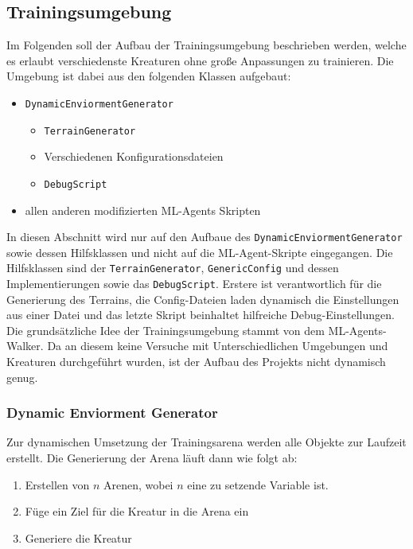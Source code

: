 
\subsection{Trainingsumgebung}
Im Folgenden soll der Aufbau der Trainingsumgebung beschrieben werden, welche es erlaubt verschiedenste Kreaturen ohne große Anpassungen zu trainieren. Die  Umgebung ist dabei aus den folgenden Klassen aufgebaut:

\begin{itemize}
	\item \texttt{DynamicEnviormentGenerator}
	\begin{itemize}
		\item \texttt{TerrainGenerator} %
		\item Verschiedenen Konfigurationsdateien
		\item \texttt{DebugScript}
	\end{itemize}
	\item allen anderen modifizierten ML-Agents Skripten
\end{itemize} 

In diesen Abschnitt wird nur auf den Aufbaue des \texttt{DynamicEnviormentGenerator} sowie dessen Hilfsklassen und nicht auf die ML-Agent-Skripte eingegangen. Die Hilfsklassen sind der \texttt{TerrainGenerator}, \texttt{GenericConfig} und dessen Implementierungen sowie das \texttt{DebugScript}. Erstere ist verantwortlich für die Generierung des Terrains, die Config-Dateien laden dynamisch die Einstellungen aus einer Datei und das letzte Skript beinhaltet hilfreiche Debug-Einstellungen. Die grundsätzliche Idee der Trainingsumgebung stammt von dem ML-Agents-Walker. Da an diesem keine Versuche mit Unterschiedlichen Umgebungen und Kreaturen durchgeführt wurden, ist der Aufbau des Projekts nicht dynamisch genug. 

\subsubsection{Dynamic Enviorment Generator}
Zur dynamischen Umsetzung der Trainingsarena werden alle Objekte zur Laufzeit erstellt. Die Generierung der Arena läuft dann wie folgt ab:
\begin{enumerate}
	\item Erstellen von $n$ Arenen, wobei $n$ eine zu setzende Variable ist. 
	\item Füge ein Ziel für die Kreatur in die Arena ein
	\item Generiere die Kreatur
\end{enumerate}

